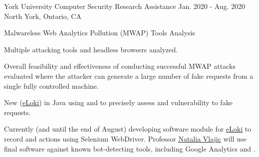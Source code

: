 

\begin{cventries}

  \cventry
    {York University} %
    {Computer Security Research Assistance} %
    {Jan. 2020 - Aug. 2020} %
    {North York, Ontario, CA} %
    {
      \begin{cvitems} %
        \item {Malwareless Web Analytics Pollution (MWAP) Tools Analysis}
          \begin{cvsubitems}
            \item {Multiple attacking tools and headless browsers analyzed.}
            \item {Overall feasibility and effectiveness of conducting successful MWAP attacks evaluated where the attacker can generate a large number of fake requests from a single fully controlled machine.}
            \item {New  (\underline{\href{https://github.com/saaniaki/eloki/tree/master/eloki}{eLoki}}) in Java using  and  to precisely assess  and  vulnerability to fake requests.}
            \item {Currently (and until the end of August) developing software module for \underline{\href{https://github.com/saaniaki/eloki/tree/master/eloki}{eLoki}} to record  and actions using Selenium WebDriver. Professor \underline{\href{http://www.cse.yorku.ca/~vlajic/}{Natalia Vlajic}} will use final software against known bot-detecting tools, including Google Analytics and .}
          \end{cvsubitems}
      \end{cvitems}
    }


\end{cventries}
